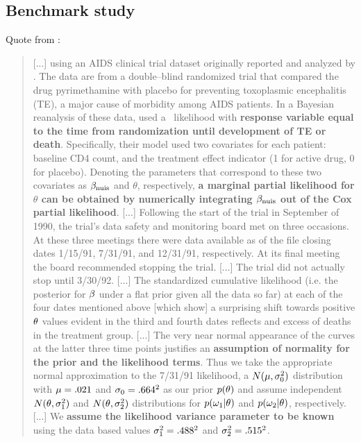 \subsection{Benchmark study}
Quote from \cite{1998Carlin}:
\begin{quotation}
[...] using an AIDS clinical trial dataset originally reported and analyzed by \cite{1994Jacobson}. The data are from a double--blind randomized trial that compared the drug pyrimethamine with placebo for preventing toxoplasmic encephalitis (TE), a major cause of morbidity among AIDS patients. In a Bayesian reanalysis of these data, \cite{1993Carlin} used a \ph\  likelihood with \textbf{response variable equal to the time from randomization until development of TE or death}. Specifically, their model used two covariates for each patient: baseline CD4 count, and the treatment effect indicator (1 for active drug, 0 for placebo). Denoting the parameters that correspond to these two covariates as $\beta_{\mathrm{nuis}}$ and $\theta$, respectively, \textbf{a marginal partial likelihood for $\theta$ can be obtained by numerically integrating $\beta_{\mathrm{nuis}}$ out of the Cox partial likelihood}. [...] Following the start of the trial in September of 1990, the trial's data safety and monitoring board met on three occasions. At these three meetings there were data available as of the file closing dates 1/15/91, 7/31/91, and 12/31/91, respectively. At its final meeting the board recommended stopping the trial. [...] The trial did not actually stop until 3/30/92. [...] The standardized cumulative likelihood (i.e. the posterior for $\beta$ under a flat prior given all the data so far) at each of the four dates mentioned above [which show] a surprising shift towards positive $\theta$ values evident in the third and fourth dates reflects and excess of deaths in the treatment group. [...] The very near normal appearance of the curves at the latter three time points justifies an \textbf{assumption of normality for the prior and the likelihood terms}. Thus we take the appropriate normal approximation to the 7/31/91 likelihood, a $N(\mu,\sigma_0^2)$ distribution with $\mu=.021$ and $\sigma_0=.664^2$ as our prior $p(\theta)$ and assume independent $N(\theta,\sigma_1^2)$ and $N(\theta,\sigma_2^2)$ distributions for $p(\omega_1|\theta)$ and $p(\omega_2|\theta)$, respectively. [...] We \textbf{assume the likelihood variance parameter to be known} using the data based values $\sigma_1^2=.488^2$ and $\sigma_2^2=.515^2$.
\end{quotation}
